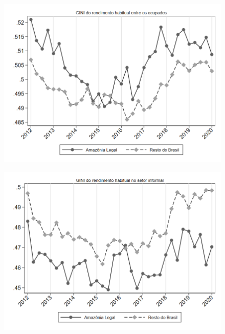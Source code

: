 \begin{frame}[label=_estrutura_renda_gini_ocupado]{}
\textit{\hyperlink{_estrutura_renda}{}}
\begin{figure}
  \centering
  \includegraphics[width=1.0\linewidth]{../../analysis/output/estrutura_renda/_estrutura_renda_gini_ocupado.png}
  \caption{}
  \label{fig:_estrutura_renda_gini_ocupado}
\end{figure}
\end{frame}

\begin{frame}[label=_estrutura_renda_gini_informal]{}
\textit{\hyperlink{_estrutura_renda}{}}
\begin{figure}
  \centering
  \includegraphics[width=1.0\linewidth]{../../analysis/output/estrutura_renda/_estrutura_renda_gini_informal.png}
  \caption{}
  \label{fig:_estrutura_renda_gini_informal}
\end{figure}
\end{frame}



